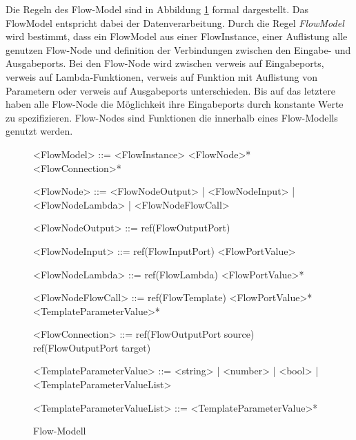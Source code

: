 \documentclass{article}
\begin{document}
    Die Regeln des Flow-Model sind in Abbildung \ref{Flow-Modell} formal dargestellt. Das FlowModel entspricht dabei der Datenverarbeitung. \cite{99}
    Durch die Regel \textit{FlowModel} wird bestimmt, dass ein FlowModel aus einer FlowInstance, einer Auflistung alle genutzen Flow-Node und definition der Verbindungen zwischen den Eingabe- und Ausgabeports.
    Bei den Flow-Node wird zwischen verweis auf Eingabeports, verweis auf Lambda-Funktionen, verweis auf Funktion mit Auflistung von Parametern oder verweis auf Ausgabeports unterschieden.
    Bis auf das letztere haben alle Flow-Node die Möglichkeit ihre Eingabeports durch konstante Werte zu spezifizieren.
    Flow-Nodes sind Funktionen die innerhalb eines Flow-Modells genutzt werden.\\
    \begin{figure}    
        \begin{grammar}
            <FlowModel> ::= <FlowInstance> <FlowNode>* <FlowConnection>*

            <FlowNode> ::= <FlowNodeOutput> | <FlowNodeInput> | <FlowNodeLambda> | <FlowNodeFlowCall>
        
            <FlowNodeOutput> ::= ref(FlowOutputPort)

            <FlowNodeInput> ::= ref(FlowInputPort) <FlowPortValue>

            <FlowNodeLambda> ::= ref(FlowLambda) <FlowPortValue>*

            <FlowNodeFlowCall> ::= ref(FlowTemplate) <FlowPortValue>* <TemplateParameterValue>*
        
            <FlowConnection> ::= ref(FlowOutputPort source) ref(FlowOutputPort target)
        
            <TemplateParameterValue> ::= <string> | <number> | <bool> | <TemplateParameterValueList>
        
            <TemplateParameterValueList> ::= <TemplateParameterValue>*
        \end{grammar}
        \caption{Flow-Modell}
        \label{Flow-Modell}
    \end{figure}
\end{document}
